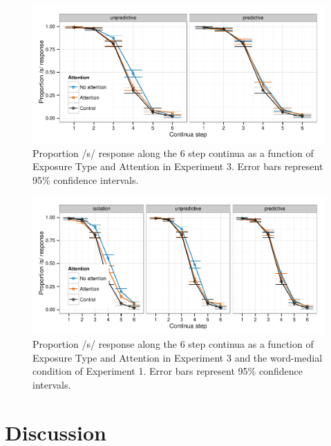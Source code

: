 \begin{figure}[!ht]
\caption{Proportion /s/ response along the 6 step continua as a function of Exposure Type and Attention in Experiment 3.  Error bars represent 95\% confidence intervals.}
\label{fig:exp3categ}
\begin{center}
\includegraphics[width=\textwidth]{graphs/exp3_categresults}
\end{center}
\end{figure}


\begin{figure}[!ht]
\caption{Proportion /s/ response along the 6 step continua as a function of Exposure Type and Attention in Experiment 3 and the word-medial condition of Experiment 1.  Error bars represent 95\% confidence intervals.}
\label{fig:exp23categ}
\begin{center}
\includegraphics[width=\textwidth]{graphs/exp23_categresults}
\end{center}
\end{figure}



\section{Discussion}
